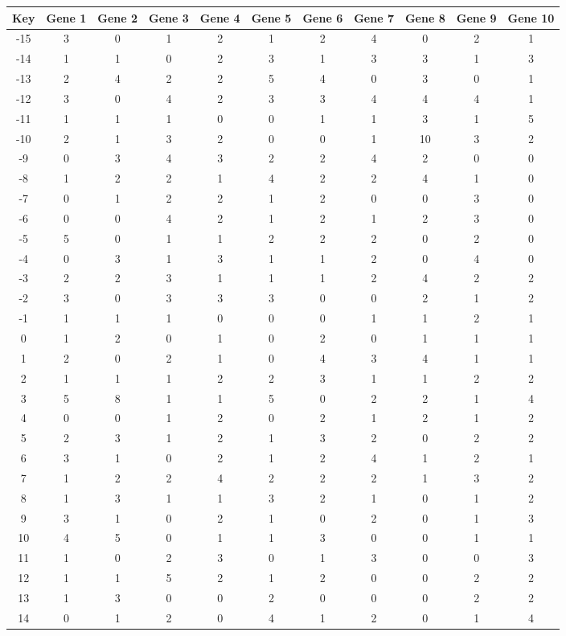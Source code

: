 \begin{tabular}{|c|c|c|c|c|c|c|c|c|c|c|}
\hline
Key & Gene 1 & Gene 2 & Gene 3 & Gene 4 & Gene 5 & Gene 6 & Gene 7 & Gene 8 & Gene 9 & Gene 10 \\
\hline
-15 & 3 & 0 & 1 & 2 & 1 & 2 & 4 & 0 & 2 & 1 \\
-14 & 1 & 1 & 0 & 2 & 3 & 1 & 3 & 3 & 1 & 3 \\
-13 & 2 & 4 & 2 & 2 & 5 & 4 & 0 & 3 & 0 & 1 \\
-12 & 3 & 0 & 4 & 2 & 3 & 3 & 4 & 4 & 4 & 1 \\
-11 & 1 & 1 & 1 & 0 & 0 & 1 & 1 & 3 & 1 & 5 \\
-10 & 2 & 1 & 3 & 2 & 0 & 0 & 1 & 10 & 3 & 2 \\
-9 & 0 & 3 & 4 & 3 & 2 & 2 & 4 & 2 & 0 & 0 \\
-8 & 1 & 2 & 2 & 1 & 4 & 2 & 2 & 4 & 1 & 0 \\
-7 & 0 & 1 & 2 & 2 & 1 & 2 & 0 & 0 & 3 & 0 \\
-6 & 0 & 0 & 4 & 2 & 1 & 2 & 1 & 2 & 3 & 0 \\
-5 & 5 & 0 & 1 & 1 & 2 & 2 & 2 & 0 & 2 & 0 \\
-4 & 0 & 3 & 1 & 3 & 1 & 1 & 2 & 0 & 4 & 0 \\
-3 & 2 & 2 & 3 & 1 & 1 & 1 & 2 & 4 & 2 & 2 \\
-2 & 3 & 0 & 3 & 3 & 3 & 0 & 0 & 2 & 1 & 2 \\
-1 & 1 & 1 & 1 & 0 & 0 & 0 & 1 & 1 & 2 & 1 \\
0 & 1 & 2 & 0 & 1 & 0 & 2 & 0 & 1 & 1 & 1 \\
1 & 2 & 0 & 2 & 1 & 0 & 4 & 3 & 4 & 1 & 1 \\
2 & 1 & 1 & 1 & 2 & 2 & 3 & 1 & 1 & 2 & 2 \\
3 & 5 & 8 & 1 & 1 & 5 & 0 & 2 & 2 & 1 & 4 \\
4 & 0 & 0 & 1 & 2 & 0 & 2 & 1 & 2 & 1 & 2 \\
5 & 2 & 3 & 1 & 2 & 1 & 3 & 2 & 0 & 2 & 2 \\
6 & 3 & 1 & 0 & 2 & 1 & 2 & 4 & 1 & 2 & 1 \\
7 & 1 & 2 & 2 & 4 & 2 & 2 & 2 & 1 & 3 & 2 \\
8 & 1 & 3 & 1 & 1 & 3 & 2 & 1 & 0 & 1 & 2 \\
9 & 3 & 1 & 0 & 2 & 1 & 0 & 2 & 0 & 1 & 3 \\
10 & 4 & 5 & 0 & 1 & 1 & 3 & 0 & 0 & 1 & 1 \\
11 & 1 & 0 & 2 & 3 & 0 & 1 & 3 & 0 & 0 & 3 \\
12 & 1 & 1 & 5 & 2 & 1 & 2 & 0 & 0 & 2 & 2 \\
13 & 1 & 3 & 0 & 0 & 2 & 0 & 0 & 0 & 2 & 2 \\
14 & 0 & 1 & 2 & 0 & 4 & 1 & 2 & 0 & 1 & 4 \\
\hline
\end{tabular}
